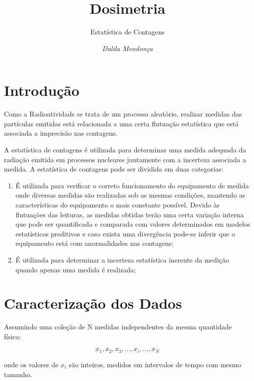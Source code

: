 \documentclass[11pt,a4paper]{article}
\title{Dosimetria}
\author{Estatística de Contagens\nocite{*}}
\date{\textit{Dalila Mendonça}}
\begin{document}
	\maketitle


\section{Introdução}

  	Como a Radioatividade se trata de um processo aleatório, realizar medidas das partículas emitidas está 	relacionada a uma certa flutuação estatística que está associada a imprecisão nas contagens.

    A estatística de contagens é utilizada para determinar uma medida adequada da radiação emitida em processos nucleares juntamente com a incerteza associada a medida. A estatística de contagens pode ser dividida em duas categorias:

        \begin{enumerate}
          \item É utilizada para verificar o correto funcionamento do equipamento de medida onde diversas medidas são realizadas sob as mesmas condições, mantendo as características do equipamento o mais constante possível. Devido às flutuações das leituras, as medidas obtidas terão uma certa variação interna que pode ser quantificada e comparada com valores determinados em modelos estatísticos preditivos e caso exista uma divergência pode-se inferir que o equipamento está com anormalidades nas contagens;
          \item É utilizada para determinar a incerteza estatística inerente da medição quando apenas uma medida é realizada; 
        \end{enumerate}
    
\section{Caracterização dos Dados}

    Assumindo uma coleção de N medidas independentes da mesma quantidade física:

        \begin{equation*}
        	x_1,x_2, x_3, ... , x_i , ... , x_N
        \end{equation*}
        
    \noindent onde os valores de $x_i$ são inteiros, medidos em intervalos de tempo com mesmo tamanho.
\end{document}
